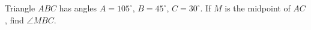 Triangle $ABC$ has angles $A=105^\circ$, $B=45^\circ$, $C=30^\circ$. If $M$ is the midpoint of $AC$, find $\angle MBC$.
